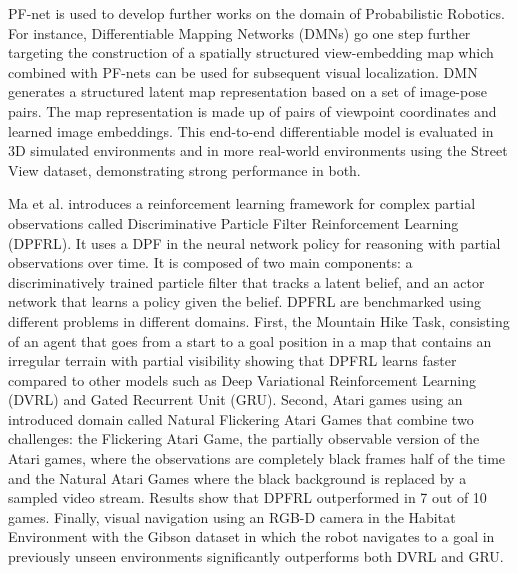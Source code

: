 PF-net is used to develop further works on the domain of Probabilistic Robotics. For instance, Differentiable Mapping Networks (DMNs)\cite{DMNmapRepresentation} go one step further targeting the construction of a spatially structured view-embedding map which combined with PF-nets can be used for subsequent visual localization. DMN generates a structured latent map representation based on a set of image-pose pairs. The map representation is made up of pairs of viewpoint coordinates and learned image embeddings. This end-to-end differentiable model is evaluated in 3D simulated environments\cite{3DenvNeuralSceneRepr}\cite{Rosenbaum2018LearningMF} and in more real-world environments using the Street View dataset\cite{StreetViewMapsDS}, demonstrating strong performance in both.

Ma et al.\cite{ma2020discriminative} introduces a reinforcement learning framework for complex partial observations called Discriminative Particle Filter Reinforcement Learning (DPFRL). It uses a DPF in the neural network policy for reasoning with partial observations over time. It is composed of two main components: a discriminatively trained particle filter that tracks a latent belief, and an actor network that learns a policy given the belief. DPFRL are benchmarked using different problems in different domains. First, the Mountain Hike Task\cite{Igl2018DeepRLPOMDPs}, consisting of an agent that goes from a start to a goal position in a map that contains an irregular terrain with partial visibility showing that DPFRL learns faster compared to other models such as Deep Variational Reinforcement Learning (DVRL) and Gated Recurrent Unit (GRU)\cite{Igl2018DeepRLPOMDPs}. Second, Atari games using an introduced domain called Natural Flickering Atari Games that combine two challenges: the Flickering Atari Game, the partially observable version of the Atari games, where the observations are completely black frames half of the time and the Natural Atari Games where the black background is replaced by a sampled video stream. Results show that DPFRL outperformed in 7 out of 10 games. Finally, visual navigation using an RGB-D camera in the Habitat Environment\cite{DBLP:journals/corr/abs-1904-01201} with the Gibson dataset\cite{DBLP:journals/corr/abs-1808-10654} in which the robot navigates to a goal in previously unseen environments significantly outperforms both DVRL and GRU. 








